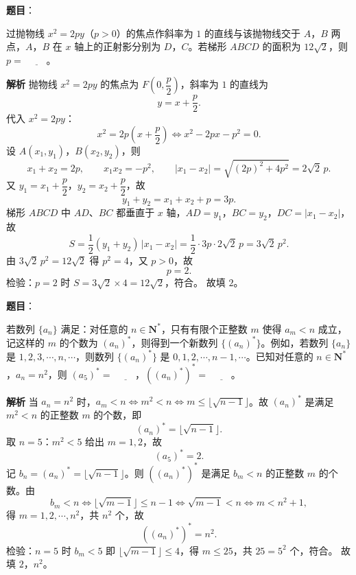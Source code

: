 \begin{answer}

\textbf{题目}：

过抛物线 $x^2=2py$（$p>0$）的焦点作斜率为 $1$ 的直线与该抛物线交于 $A$，$B$ 两点，$A$，$B$ 在 $x$ 轴上的正射影分别为 $D$，$C$。若梯形 $ABCD$ 的面积为 $12\sqrt2$，则 $p=$ $\underline{\qquad}$。

\textbf{解析}
抛物线 $x^2=2py$ 的焦点为 $F\left(0,\dfrac p2\right)$，斜率为 $1$ 的直线为
\nopagebreak[4]
\[y=x+\frac p2.\]
代入 $x^2=2py$：
\nopagebreak[4]
\[x^2=2p\left(x+\frac p2\right)\iff x^2-2px-p^2=0.\]
设 $A(x_1,y_1)$，$B(x_2,y_2)$，则
\nopagebreak[4]
\[x_1+x_2=2p,\qquad x_1x_2=-p^2,\qquad |x_1-x_2|=\sqrt{(2p)^2+4p^2}=2\sqrt2\,p.\]
又 $y_1=x_1+\dfrac p2$，$y_2=x_2+\dfrac p2$，故
\nopagebreak[4]
\[y_1+y_2=x_1+x_2+p=3p.\]
梯形 $ABCD$ 中 $AD$、$BC$ 都垂直于 $x$ 轴，$AD=y_1$，$BC=y_2$，$DC=|x_1-x_2|$，故
\nopagebreak[4]
\[S=\frac12(y_1+y_2)\,|x_1-x_2|=\frac12\cdot3p\cdot2\sqrt2\,p=3\sqrt2\,p^2.\]
由 $3\sqrt2\,p^2=12\sqrt2$ 得 $p^2=4$，又 $p>0$，故
\nopagebreak[4]
\[p=2.\]
检验：$p=2$ 时 $S=3\sqrt2\times4=12\sqrt2$，符合。
故填 $2$。


\end{answer}
\begin{answer}

\textbf{题目}：

若数列 $\{a_n\}$ 满足：对任意的 $n\in\mathbf N^*$，只有有限个正整数 $m$ 使得 $a_m<n$ 成立，记这样的 $m$ 的个数为 $(a_n)^*$，则得到一个新数列 $\{(a_n)^*\}$。例如，若数列 $\{a_n\}$ 是 $1,2,3,\cdots,n,\cdots$，则数列 $\{(a_n)^*\}$ 是 $0,1,2,\cdots,n-1,\cdots$。已知对任意的 $n\in\mathbf N^*$，$a_n=n^2$，则 $(a_5)^*=$ $\underline{\qquad}$，$((a_n)^*)^*=$ $\underline{\qquad}$。

\textbf{解析}
当 $a_n=n^2$ 时，$a_m<n\iff m^2<n\iff m\leqslant\lfloor\sqrt{n-1}\rfloor$。故 $(a_n)^*$ 是满足 $m^2<n$ 的正整数 $m$ 的个数，即
\nopagebreak[4]
\[(a_n)^*=\bigl\lfloor\sqrt{n-1}\bigr\rfloor.\]
取 $n=5$：$m^2<5$ 给出 $m=1,2$，故
\nopagebreak[4]
\[(a_5)^*=2.\]
记 $b_n=(a_n)^*=\lfloor\sqrt{n-1}\rfloor$。则 $((a_n)^*)^*$ 是满足 $b_m<n$ 的正整数 $m$ 的个数。由
\nopagebreak[4]
\[b_m<n\iff\bigl\lfloor\sqrt{m-1}\bigr\rfloor\leqslant n-1\iff\sqrt{m-1}<n\iff m<n^2+1,\]
得 $m=1,2,\cdots,n^2$，共 $n^2$ 个，故
\nopagebreak[4]
\[((a_n)^*)^*=n^2.\]
检验：$n=5$ 时 $b_m<5$ 即 $\lfloor\sqrt{m-1}\rfloor\leqslant4$，得 $m\leqslant25$，共 $25=5^2$ 个，符合。
故填 $2$，$n^2$。


\end{answer}

